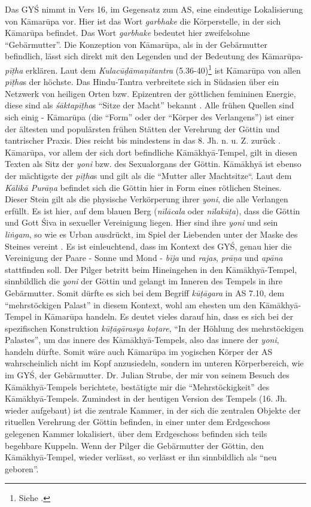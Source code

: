 \documentclass[a4paper,12pt]{article}
\begin{document}
Das GYŚ nimmt in Vers 16, im Gegensatz zum AS, eine eindeutige Lokalisierung von Kāmarūpa vor. Hier ist das Wort \textit{garbhake} die Körperstelle, in der sich Kāmarūpa befindet. Das Wort \textit{garbhake} bedeutet hier zweifelsohne ``Gebärmutter''. Die Konzeption von Kāmarūpa, als in der Gebärmutter befindlich, lässt sich direkt mit den Legenden und der Bedeutung des Kāmarūpa-\textit{pīṭha} erklären. Laut dem \textit{Kulacūḍāmaṇitantra} (5.36-40)\footnote{Siehe \parencite{kulacuda}.} ist Kāmarūpa von allen \textit{pīṭha}s der höchste. Das Hindu-Tantra verbreitete sich in Südasien über ein Netzwerk von heiligen Orten bzw. Epizentren der göttlichen femininen Energie, diese sind als \textit{śāktapīṭha}s ``Sitze der Macht'' bekannt \parencite[31]{urban2010}. Alle frühen Quellen sind sich einig - Kāmarūpa (die ``Form'' oder der ``Körper des Verlangens'') ist einer der ältesten und populärsten frühen Stätten der Verehrung der Göttin und tantrischer Praxis. Dies reicht bis mindestens in das 8. Jh. n. u. Z. zurück \parencite[32]{urban2010}. Kāmarūpa, vor allem der sich dort befindliche Kāmākhyā-Tempel, gilt in diesen Texten als Sitz der \textit{yoni} bzw. des Sexualorgans der Göttin. Kāmākhyā ist ebenso der mächtigste der \textit{pīṭha}s und gilt als die ``Mutter aller Machtsitze“. Laut dem \textit{Kālikā Purāṇa} befindet sich die Göttin hier in Form eines rötlichen Steines. Dieser Stein gilt als die physische Verkörperung ihrer \textit{yoni}, die alle Verlangen erfüllt. Es ist hier, auf dem blauen Berg (\textit{nīlācala} oder \textit{nīlakūṭa}), dass die Göttin und Gott Śiva in sexueller Vereinigung liegen. Hier sind ihre \textit{yoni} und sein \textit{liṅgam}, so wie es Urban ausdrückt, im Spiel der Liebenden unter der Maske des Steines vereint \parencite[35]{urban2010}. Es ist einleuchtend, dass im Kontext des GYŚ, genau hier die Vereinigung der Paare - Sonne und Mond - \textit{bīja} und \textit{rajas}, \textit{prāṇa} und \textit{apāna} stattfinden soll. Der Pilger betritt beim Hineingehen in den Kāmākhyā-Tempel, sinnbildlich die \textit{yoni} der Göttin und gelangt im Inneren des Tempels in ihre Gebärmutter. Somit dürfte es sich bei dem Begriff \textit{kūṭāgara} in AS 7.10, dem ``mehrstöckigen Palast'' in diesem Kontext, wohl am ehesten um den Kāmākhyā-Tempel in Kāmarūpa handeln. Es deutet vieles darauf hin, dass es sich bei der spezifischen Konstruktion \textit{kūṭāgārasya koṭare}, ``In der Höhlung des mehrstöckigen Palastes'', um das innere des Kāmākhyā-Tempels, also das innere der \textit{yoni}, handeln dürfte. Somit wäre auch Kāmarūpa im yogischen Körper der AS wahrscheinlich nicht im Kopf anzusiedeln, sondern im unteren Körperbereich, wie im GYŚ, der Gebärmutter. Dr. Julian Strube, der mir von seinem Besuch des Kāmākhyā-Tempels berichtete, bestätigte mir die ``Mehrstöckigkeit'' des Kāmākhyā-Tempels. Zumindest in der heutigen Version des Tempels (16. Jh. wieder aufgebaut) ist die zentrale Kammer, in der sich die zentralen Objekte der rituellen Verehrung der Göttin befinden, in einer unter dem Erdgeschoss gelegenen Kammer lokalisiert, über dem Erdgeschoss befinden sich teils begehbare Kuppeln. Wenn der Pilger die Gebärmutter der Göttin, den Kāmākhyā-Tempel, wieder verlässt, so verlässt er ihn sinnbildlich als ``neu geboren''. 
\end{document}
